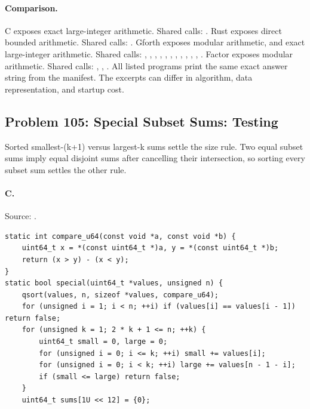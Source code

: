 \paragraph{Comparison.}
C exposes exact large-integer arithmetic. Shared calls: \texttt{}. Rust exposes direct bounded arithmetic. Shared calls: \texttt{}. Gforth exposes modular arithmetic, and exact large-integer arithmetic. Shared calls: \texttt{}, \texttt{}, \texttt{}, \texttt{}, \texttt{}, \texttt{}, \texttt{}, \texttt{}, \texttt{}, \texttt{}, \texttt{}, \texttt{}. Factor exposes modular arithmetic. Shared calls: \texttt{}, \texttt{}, \texttt{}.
All listed programs print the same exact answer string from the manifest. The excerpts can differ in algorithm, data representation, and startup cost.

\subsection{Problem 105: Special Subset Sums: Testing}
\label{walkthrough:p105}
Sorted smallest-(k+1) versus largest-k sums settle the size rule. Two equal subset sums imply equal disjoint sums after cancelling their intersection, so sorting every subset sum settles the other rule.

\paragraph{C.} Source: .
\begin{lstlisting}
static int compare_u64(const void *a, const void *b) {
    uint64_t x = *(const uint64_t *)a, y = *(const uint64_t *)b;
    return (x > y) - (x < y);
}
static bool special(uint64_t *values, unsigned n) {
    qsort(values, n, sizeof *values, compare_u64);
    for (unsigned i = 1; i < n; ++i) if (values[i] == values[i - 1]) return false;
    for (unsigned k = 1; 2 * k + 1 <= n; ++k) {
        uint64_t small = 0, large = 0;
        for (unsigned i = 0; i <= k; ++i) small += values[i];
        for (unsigned i = 0; i < k; ++i) large += values[n - 1 - i];
        if (small <= large) return false;
    }
    uint64_t sums[1U << 12] = {0};
\end{lstlisting}

